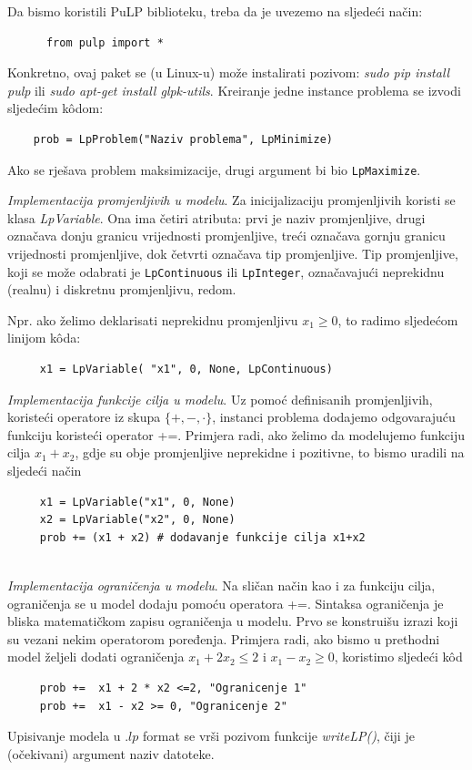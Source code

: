 \documentclass[b5paper, utf8, 11pt, colorlinks]{book}
\theoremstyle{definition}
\begin{document}
  Da bismo koristili PuLP biblioteku, treba da je uvezemo na sljedeći način:
  \begin{verbatim}
  	  from pulp import *
  \end{verbatim}
 Konkretno, ovaj paket se (u Linux-u) može instalirati pozivom: \emph{sudo pip install pulp} ili \emph{sudo apt-get install glpk-utils}. 
 Kreiranje jedne instance problema se izvodi sljedećim k\^odom:
 \begin{verbatim}
 	prob = LpProblem("Naziv problema", LpMinimize)
 \end{verbatim}
 Ako se rješava problem maksimizacije, drugi argument bi  bio \texttt{LpMaximize}. 

 {\emph{Implementacija promjenljivih u modelu}}.  Za inicijalizaciju promjenljivih koristi se klasa \emph{LpVariable}. Ona ima četiri atributa: prvi je naziv promjenljive, drugi označava donju granicu vrijednosti promjenljive, treći označava gornju granicu vrijednosti promjenljive, dok četvrti označava tip promjenljive. Tip promjenljive, koji se može odabrati je \texttt{LpContinuous} ili \texttt{LpInteger}, označavajući neprekidnu (realnu) i diskretnu promjenljivu, redom.  

Npr. ako želimo deklarisati neprekidnu promjenljivu $x_1\geq 0$, to radimo sljedećom linijom k\^oda:

\begin{verbatim}
	 x1 = LpVariable( "x1", 0, None, LpContinuous)
\end{verbatim}
 
  {\emph{Implementacija funkcije cilja u modelu}}. Uz pomoć definisanih promjenljivih, koristeći operatore iz skupa $\{+,-, \cdot\}$, instanci problema dodajemo odgovarajuću funkciju  koristeći operator +=. Primjera radi, ako želimo da modelujemo funkciju cilja $x_1 + x_2$, gdje su obje promjenljive neprekidne i pozitivne, to bismo uradili na sljedeći način
\begin{verbatim}
	 x1 = LpVariable("x1", 0, None)
	 x2 = LpVariable("x2", 0, None) 
	 prob += (x1 + x2) # dodavanje funkcije cilja x1+x2 
\end{verbatim} \\ \vspace{-1.5cm}
  {\emph{Implementacija ograničenja u modelu}}.  Na sličan način kao i za funkciju cilja, ograničenja se  u model dodaju pomoću operatora +=. Sintaksa ograničenja je bliska matematičkom zapisu ograničenja u modelu. Prvo se konstruišu izrazi koji su vezani nekim operatorom poređenja. Primjera radi, ako bismo u prethodni model željeli dodati ograničenja $x_1 + 2 x_2 \leq 2$ i $x_1-x_2 \geq 0$, koristimo sljedeći k\^od
\begin{verbatim}
	 prob +=  x1 + 2 * x2 <=2, "Ogranicenje 1"
	 prob +=  x1 - x2 >= 0, "Ogranicenje 2" 
\end{verbatim}
Upisivanje modela u .$lp$ format se vrši pozivom funkcije \emph{writeLP()}, čiji je (očekivani) argument naziv datoteke. 
\end{document}
